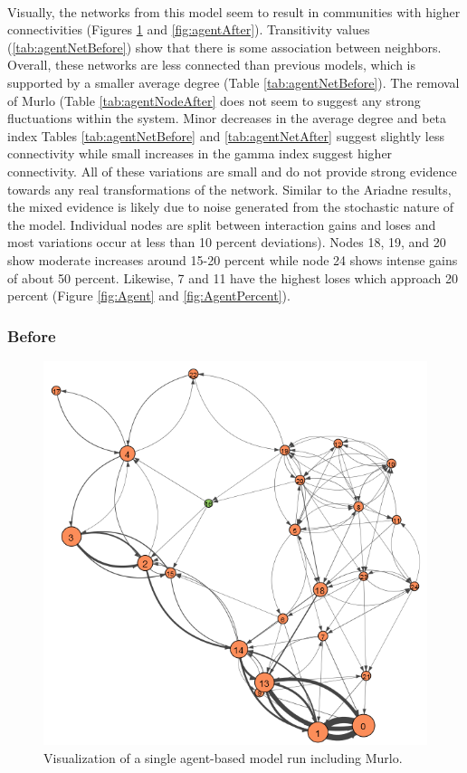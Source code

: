 \documentclass[12pt,a4paper]{thesis}
\begin{document}
\paragraph{}
Visually, the networks from this model seem to result in communities with higher connectivities (Figures \ref{fig:agentBefore} and \ref{fig:agentAfter}). Transitivity values (\ref{tab:agentNetBefore}) show that there is some association between neighbors. Overall, these networks are less connected than previous models, which is supported by a smaller average degree (Table \ref{tab:agentNetBefore}). The removal of Murlo (Table \ref{tab:agentNodeAfter} does not seem to suggest any strong fluctuations within the system. Minor decreases in the average degree and beta index Tables \ref{tab:agentNetBefore} and \ref{tab:agentNetAfter} suggest slightly less connectivity while small increases in the gamma index suggest higher connectivity. All of these variations are small and do not provide strong evidence towards any real transformations of the network. Similar to the Ariadne results, the mixed evidence is likely due to noise generated from the stochastic nature of the model. Individual nodes are split between interaction gains and loses and most variations occur at less than 10 percent deviations). Nodes 18, 19, and 20 show moderate increases around 15-20 percent while node 24 shows intense gains of about 50 percent. Likewise, 7 and 11 have the highest loses which approach 20 percent (Figure \ref{fig:Agent} and \ref{fig:AgentPercent}). 

\subsubsection{Before}

\begin{figure}[H]
\centering
\includegraphics[width=0.9\linewidth]{./BeforeViz/agent}
\caption{Visualization of a single agent-based model run including Murlo.}
\label{fig:agentBefore}
\end{figure}
\end{document}
